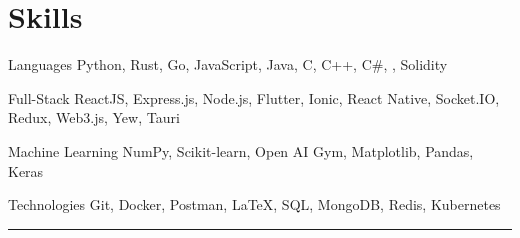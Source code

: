 \documentclass[]{resume-openfont}
\begin{document}
    \section{Skills}
        \begin{skillsListIndent}
            \item[Languages] {\fontsize{9pt}{10pt}  Python, Rust, Go, JavaScript, Java, C, C++, C\#, , Solidity}\\
            \item[Full-Stack]{\fontsize{9pt}{10pt}  ReactJS, Express.js, Node.js, Flutter, Ionic, React Native, Socket.IO, Redux, Web3.js, Yew, Tauri}\\
            \item[Machine Learning]{\fontsize{9pt}{10pt}  NumPy, Scikit-learn, Open AI Gym, Matplotlib, Pandas, Keras}\\
            \item[Technologies]{\fontsize{9pt}{10pt}  Git, Docker, Postman, \LaTeX, SQL, MongoDB, Redis, Kubernetes}\\
        \end{skillsListIndent}
        \sectionsep
    \hrule
\end{document}
